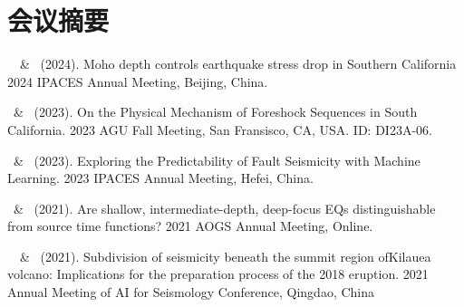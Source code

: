\section{会议摘要}

\begin{etaremune}
    \item
        \Me\, \ZLi\ \& \SMa\ (2024).
        Moho depth controls earthquake stress drop in Southern California
        2024 IPACES Annual Meeting, Beijing, China.
    
    \item
        \Me\ \& \ZLi\   (2023).
        On the Physical Mechanism of Foreshock Sequences in South California.
        2023 AGU Fall Meeting, San Fransisco, CA, USA. ID: DI23A-06.
    
    \item
        \Me\ \& \ZLi\   (2023).
        Exploring the Predictability of Fault Seismicity with Machine Learning.
        2023 IPACES Annual Meeting, Hefei, China.
    
    \item
        \Me\ \& \ZLi\ (2021).
        Are shallow, intermediate-depth, deep-focus EQs distinguishable from source time functions? 
        2021 AOGS Annual Meeting, Online.
    
    \item
        \Me\, \ZLi\ \& \HHuang\ (2021).
        Subdivision of seismicity beneath the summit region ofKilauea volcano: Implications for the preparation process of the 2018 eruption.
        2021 Annual Meeting of AI for Seismology Conference, Qingdao, China
    
    \end{etaremune}
    

